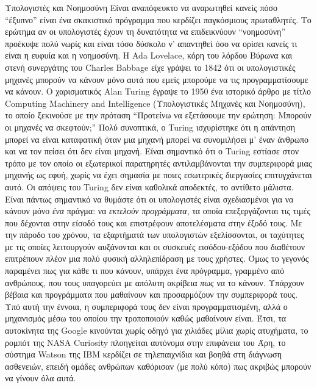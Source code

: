 \documentclass[a4paper,11pt,oneside]{book}
\begin{document}
{{{\begin{theory}{Υπολογιστές και Νοημοσύνη}
Είναι αναπόφευκτο να αναρωτηθεί κανείς πόσο ``έξυπνο'' είναι ένα σκακιστικό πρόγραμμα που κερδίζει παγκόσμιους πρωταθλητές. Το ερώτημα αν οι υπολογιστές έχουν τη δυνατότητα να επιδεικνύουν ``νοημοσύνη'' προέκυψε πολύ νωρίς και είναι τόσο δύσκολο ν' απαντηθεί όσο να ορίσει κανείς τι είναι η ευφυία και η νοημοσύνη. Η Ada Lovelace, κόρη του λόρδου Βύρωνα και στενή συνεργάτης του Charles Babbage είχε γράψει το 1842 ότι οι υπολογιστικές μηχανές μπορούν να κάνουν μόνο αυτά που εμείς μπορούμε να τις προγραμματίσουμε να κάνουν. Ο χαρισματικός Alan Turing έγραψε το 1950 ένα ιστορικό άρθρο με τίτλο Computing Machinery and Intelligence (Υπολογιστικές Μηχανές και Νοημοσύνη), το οποίο ξεκινούσε με την πρόταση ``Προτείνω να εξετάσουμε την ερώτηση: Μπορούν οι μηχανές να σκεφτούν;'' Πολύ συνοπτικά, ο Turing ισχυρίστηκε ότι η απάντηση μπορεί να είναι καταφατική όταν μια μηχανή μπορεί να συνομιλήσει μ' έναν άνθρωπο και να τον πείσει ότι δεν είναι μηχανή. Είναι σημαντικό ότι ο Turing εστίασε στον τρόπο με τον οποίο οι εξωτερικοί παρατηρητές αντιλαμβάνονται την συμπεριφορά μιας μηχανής ως εφυή, χωρίς να έχει σημασία με ποιες εσωτερικές διεργασίες επιτυγχάνεται αυτό. Οι απόψεις του Turing δεν είναι καθολικά αποδεκτές, το αντίθετο μάλιστα. Είναι πάντως σημαντικό να θυμάστε ότι οι υπολογιστές είναι σχεδιασμένοι για να κάνουν μόνο \emph{ένα} πράγμα: να \emph{εκτελούν προγράμματα}, τα οποία επεξεργάζονται τις τιμές που δέχονται στην είσοδό τους και επιστρέφουν αποτελέσματα στην έξοδό τους. Με την πάροδο του χρόνου, τα εξαρτήματά των υπολογιστών εξελίσσονται, οι ταχύτητες με τις οποίες λειτουργούν αυξάνονται και οι συσκευές εισόδου-εξόδου που διαθέτουν επιτρέπουν πλέον μια πολύ φυσική αλληλεπίδραση με τους χρήστες. Όμως το γεγονός παραμένει πως για κάθε τι που κάνουν, υπάρχει ένα πρόγραμμα, γραμμένο από ανθρώπους, που τους υπαγορεύει με απόλυτη ακρίβεια \emph{πως} να το κάνουν. Υπάρχουν βέβαια και προγράμματα που μαθαίνουν και προσαρμόζουν την συμπεριφορά τους. Υπό αυτή την έννοια, η συμπεριφορά τους δεν είναι προγραμματισμένη, αλλά ο μηχανισμός μέσω του οποίου την τροποποιούν καθώς μαθαίνουν είναι. Έτσι, τα αυτοκίνητα της Google κινούνται χωρίς οδηγό για χιλιάδες μίλια χωρίς ατυχήματα, το ρομπότ της NASA Curiosity πλοηγείται αυτόνομα στην επιφάνεια του Άρη, το σύστημα Watson της IBM κερδίζει σε τηλεπαιχνίδια και βοηθά στη διάγνωση ασθενειών, επειδή ομάδες ανθρώπων καθόρισαν (με πολύ κόπο) πως ακριβώς μπορούν να γίνουν όλα αυτά. 


\end{theory}}}}
\end{document}
